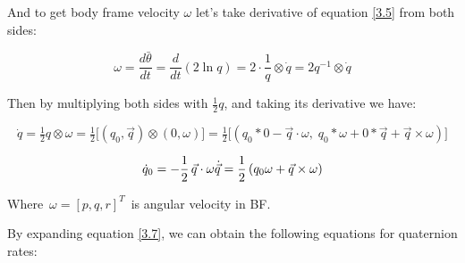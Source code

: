 And to get body frame velocity $\omega$ let’s take derivative of equation \eqref{3.5} from both sides:

\[
\omega = \frac{d\bar{\theta}}{dt} = \frac{d}{dt}(2 \ln q) 
= 2 \cdot \frac{1}{q} \otimes \dot{q} = 2 q^{-1} \otimes \dot{q}
\]


Then by multiplying both sides with $\tfrac{1}{2}q$, and taking its derivative we have:

\begin{equation}
\dot{q} = \tfrac{1}{2} q \otimes \omega = \tfrac{1}{2} \big[ (q_0, \vec{q}) \otimes (0, \omega) \big] = \tfrac{1}{2} \big[ (q_0 \ast 0 - \vec{q}\cdot \omega,\; q_0 \ast \omega + 0 \ast \vec{q} + \vec{q} \times \omega ) \big]
\label{3.6}
\end{equation}





\begin{equation}
\dot{q}_0 = -\frac{1}{2}\,\vec{q}\cdot \omega \\
\dot{\vec{q}} = \frac{1}{2}\left(q_0\omega + \vec{q}\times\omega\right)
\label{3.7}
\end{equation}





Where $\,\omega=[p,q,r]^{T}\,$ is angular velocity in BF.

By expanding equation \eqref{3.7}, we can obtain the following equations for quaternion rates:


